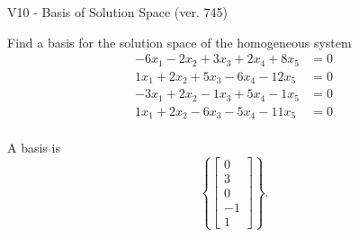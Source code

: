 \begin{exercise}
  \begin{exerciseTitle}V10 - Basis of Solution Space (ver. 745)\end{exerciseTitle}
  \begin{exerciseStatement}
    Find a basis for the solution space of the homogeneous system 
\begin{align*}
 -6 x_ 1 -2 x_ 2 + 3 x_ 3 + 2 x_ 4 + 8 x_ 5 &= 0  \\ 
  1 x_ 1 + 2 x_ 2 + 5 x_ 3 -6 x_ 4 -12 x_ 5 &= 0  \\ 
  -3 x_ 1 + 2 x_ 2 -1 x_ 3 + 5 x_ 4 -1 x_ 5 &= 0  \\ 
  1 x_ 1 + 2 x_ 2 -6 x_ 3 -5 x_ 4 -11 x_ 5 &= 0  \\ 
 \end{align*}


 
  \end{exerciseStatement}

  \begin{exerciseAnswer}
   A basis is   
\[\left\{\left[\begin{array}{c}
0 \\
3 \\
0 \\
-1 \\
1
\end{array}\right]\right\}.\]

  


  \end{exerciseAnswer}
\end{exercise}